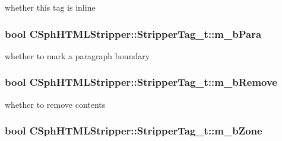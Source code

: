 whether this tag is inline 

\hypertarget{structCSphHTMLStripper_1_1StripperTag__t_a0bb414b75abfa4f37b3c2ac8f19094a4}{
\subsubsection[{m\-\_\-b\-Para}]{\setlength{\rightskip}{0pt plus 5cm}bool C\-Sph\-H\-T\-M\-L\-Stripper\-::\-Stripper\-Tag\-\_\-t\-::m\-\_\-b\-Para}}\label{structCSphHTMLStripper_1_1StripperTag__t_a0bb414b75abfa4f37b3c2ac8f19094a4}


whether to mark a paragraph boundary 

\hypertarget{structCSphHTMLStripper_1_1StripperTag__t_a8875e17609673d8becab5e9496c21170}{
\subsubsection[{m\-\_\-b\-Remove}]{\setlength{\rightskip}{0pt plus 5cm}bool C\-Sph\-H\-T\-M\-L\-Stripper\-::\-Stripper\-Tag\-\_\-t\-::m\-\_\-b\-Remove}}\label{structCSphHTMLStripper_1_1StripperTag__t_a8875e17609673d8becab5e9496c21170}


whether to remove contents 

\hypertarget{structCSphHTMLStripper_1_1StripperTag__t_aedc07d9cfa457869152cb5a5f90ddbc8}{
\subsubsection[{m\-\_\-b\-Zone}]{\setlength{\rightskip}{0pt plus 5cm}bool C\-Sph\-H\-T\-M\-L\-Stripper\-::\-Stripper\-Tag\-\_\-t\-::m\-\_\-b\-Zone}}\label{structCSphHTMLStripper_1_1StripperTag__t_aedc07d9cfa457869152cb5a5f90ddbc8}


